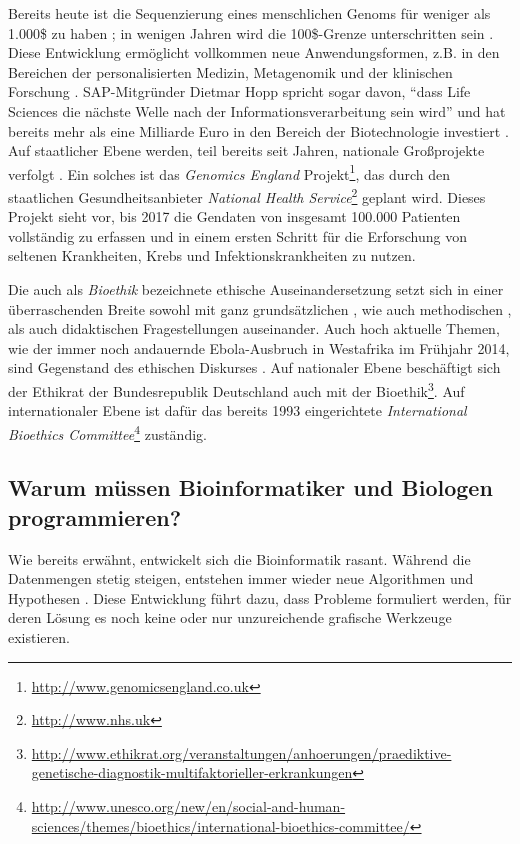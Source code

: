 Bereits heute ist die Sequenzierung eines menschlichen Genoms für weniger als 1.000\$ zu haben \citep{Young:2014tl}; in wenigen Jahren wird die 100\$-Grenze unterschritten sein \citep{Reinert:tg}. Diese Entwicklung ermöglicht vollkommen neue Anwendungsformen, z.B. in den Bereichen der personalisierten Medizin, Metagenomik und der klinischen Forschung \citep{Reinert:tg}. SAP-Mitgründer Dietmar Hopp spricht sogar davon, ``dass Life Sciences die nächste Welle nach der Informationsverarbeitung sein wird'' und hat bereits mehr als eine Milliarde Euro in den Bereich der Biotechnologie investiert \citep{Ziegler:2015tt}. Auf staatlicher Ebene werden, teil bereits seit Jahren, nationale Großprojekte verfolgt \citep{Young:2014tl}. Ein solches ist das \textit{Genomics England} Projekt\footnote{\url{http://www.genomicsengland.co.uk}}, das durch den staatlichen Gesundheitsanbieter \textit{National Health Service}\footnote{\url{http://www.nhs.uk}} geplant wird. Dieses Projekt sieht vor, bis 2017 die Gendaten von insgesamt 100.000 Patienten vollständig zu erfassen und in einem ersten Schritt für die Erforschung von seltenen Krankheiten, Krebs und Infektionskrankheiten zu nutzen.

Die auch als \textit{Bioethik} bezeichnete ethische Auseinandersetzung setzt sich in einer überraschenden Breite sowohl mit ganz grundsätzlichen \citep{Bouvet:2006ig}, wie auch methodischen \citep{Vayena:2015kk}, als auch didaktischen \citep{Gasparich:2014eg} Fragestellungen auseinander. Auch hoch aktuelle Themen, wie der immer noch andauernde Ebola-Ausbruch in Westafrika im Frühjahr 2014, sind Gegenstand des ethischen Diskurses \citep{Blais:2015tw}. Auf nationaler Ebene beschäftigt sich der Ethikrat der Bundesrepublik Deutschland auch mit der Bioethik\footnote{\url{http://www.ethikrat.org/veranstaltungen/anhoerungen/praediktive-genetische-diagnostik-multifaktorieller-erkrankungen}}. Auf internationaler Ebene ist dafür das bereits 1993 eingerichtete \textit{International Bioethics Committee}\footnote{\url{http://www.unesco.org/new/en/social-and-human-sciences/themes/bioethics/international-bioethics-committee/}} zuständig. 




\subsection[Bioinformatik und Programmieren]{Warum müssen Bioinformatiker und Biologen programmieren?}

Wie bereits erwähnt, entwickelt sich die Bioinformatik rasant. Während die Datenmengen stetig steigen, entstehen immer wieder neue Algorithmen und Hypothesen \citep{Letondal:2006dy}. Diese Entwicklung führt dazu, dass Probleme formuliert werden, für deren Lösung es noch keine \citep{Tisdall:2001td} oder nur unzureichende \citep{Letondal:2006dy} grafische Werkzeuge existieren.

